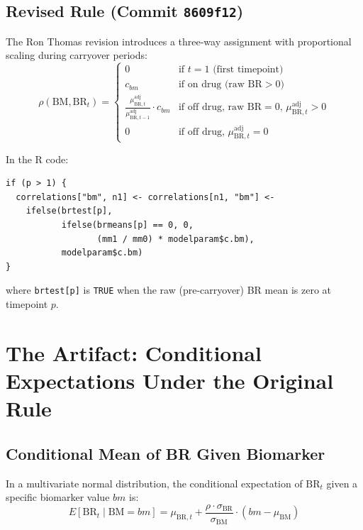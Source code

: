 \documentclass[11pt]{article}
\begin{document}
\subsection{Revised Rule (Commit \texttt{8609f12})}

The Ron Thomas revision introduces a three-way assignment with
proportional scaling during carryover periods:
\[
\rho(\text{BM}, \text{BR}_t) =
\begin{cases}
0 & \text{if } t = 1 \text{ (first timepoint)} \\[4pt]
c_{bm} & \text{if on drug (raw BR} > 0\text{)} \\[4pt]
\displaystyle\frac{\mu_{\text{BR},t}^{\text{adj}}}
  {\mu_{\text{BR},t-1}^{\text{adj}}} \cdot c_{bm}
  & \text{if off drug, raw BR} = 0,\,
    \mu_{\text{BR},t}^{\text{adj}} > 0 \\[4pt]
0 & \text{if off drug, }
  \mu_{\text{BR},t}^{\text{adj}} = 0
\end{cases}
\]

In the R code:
\begin{verbatim}
if (p > 1) {
  correlations["bm", n1] <- correlations[n1, "bm"] <-
    ifelse(brtest[p],
           ifelse(brmeans[p] == 0, 0,
                  (mm1 / mm0) * modelparam$c.bm),
           modelparam$c.bm)
}
\end{verbatim}

where \texttt{brtest[p]} is \texttt{TRUE} when the raw
(pre-carryover) BR mean is zero at timepoint $p$.

\section{The Artifact: Conditional Expectations Under the
         Original Rule}

\subsection{Conditional Mean of BR Given Biomarker}

In a multivariate normal distribution, the conditional
expectation of $\text{BR}_t$ given a specific biomarker
value $bm$ is:
\begin{equation}
E[\text{BR}_t \mid \text{BM} = bm] =
  \mu_{\text{BR},t} +
  \frac{\rho \cdot \sigma_{\text{BR}}}{\sigma_{\text{BM}}}
  \cdot (bm - \mu_{\text{BM}})
\label{eq:conditional}
\end{equation}
\end{document}
